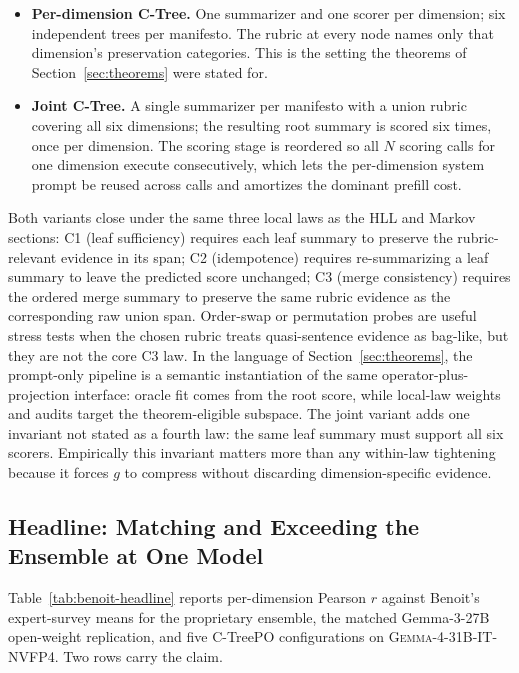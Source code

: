 \begin{itemize}[leftmargin=1.5em]
    \item \textbf{Per-dimension C-Tree.} One summarizer and one scorer
          per dimension; six independent trees per manifesto. The
          rubric at every node names only that dimension's preservation
          categories. This is the setting the theorems of
          Section~\ref{sec:theorems} were stated for.
    \item \textbf{Joint C-Tree.} A single summarizer per manifesto
          with a union rubric covering all six dimensions; the
          resulting root summary is scored six times, once per
          dimension. The scoring stage is reordered so all $N$
          scoring calls for one dimension execute consecutively,
          which lets the per-dimension system prompt be reused across
          calls and amortizes the dominant prefill cost.
\end{itemize}

Both variants close under the same three local laws as the HLL and
Markov sections: C1 (leaf sufficiency) requires each leaf summary to
preserve the rubric-relevant evidence in its span; C2 (idempotence)
requires re-summarizing a leaf summary to leave the predicted score
unchanged; C3 (merge consistency) requires the ordered merge summary to
preserve the same rubric evidence as the corresponding raw union span.
Order-swap or permutation probes are useful stress tests when the chosen
rubric treats quasi-sentence evidence as bag-like, but they are not the
core C3 law. In the language of Section~\ref{sec:theorems}, the prompt-only
pipeline is a semantic instantiation of the same operator-plus-projection
interface: oracle fit comes from the root score, while local-law weights
and audits target the theorem-eligible subspace. The joint variant adds
one invariant not stated as a fourth law: the same leaf summary must
support all six scorers. Empirically this invariant matters more than any
within-law tightening because it forces $g$ to compress without discarding
dimension-specific evidence.

\subsection{Headline: Matching and Exceeding the Ensemble at One Model}\label{sec:benoit-headline}

Table~\ref{tab:benoit-headline} reports per-dimension Pearson $r$
against Benoit's expert-survey means for the proprietary ensemble, the
matched Gemma-3-27B open-weight replication, and five C-TreePO
configurations on \textsc{Gemma-4-31B-IT-NVFP4}. Two rows carry the
claim.

